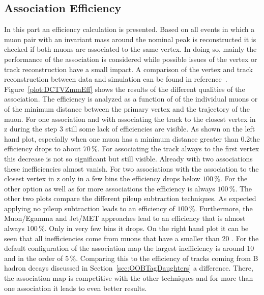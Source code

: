 \subsection{Association Efficiency \label{sec:DCTVAE}}

In this part an efficiency calculation is presented. Based on all events in which a muon pair with an invariant mass around the nominal \Zz peak is reconstructed it is checked if both muons are associated to the same vertex. In doing so, mainly the performance of the association is considered while possible issues of the vertex or track reconstruction have a small impact. A comparison of the vertex and track reconstruction between data and simulation can be found in reference~. Figure~\ref{plot:DCTVZmmEff} shows the results of the different qualities of the association. The efficiency is analyzed as a function of \pt{} of the individual muons or of the minimum distance between the primary vertex and the trajectory of the muon.  For one association and with associating the track to the closest vertex in z during the step 3 still some lack of efficiencies are visible. As shown on the left hand plot, especially when one muon has a minimum distance greater than 0.2\mm the efficiency drops to about $70\,\%$. For associating the track always to the first vertex this decrease is not so significant but still visible. Already with two associations these inefficiencies almost vanish. For two associations with the association to the closest vertex in z only in a few bins the efficiency drops below $100\,\%$. For the other option as well as for more associations the efficiency is always $100\,\%$. The other two plots compare the different pileup subtraction techniques. As expected applying no pileup subtraction leads to an efficiency of $100\,\%$. Furthermore, the Muon/Egamma and Jet/MET approaches lead to an efficiency that is almost always $100\,\%$. Only in very few bins it drops. On the right hand plot it can be seen that all inefficiencies come from muons that have a \pt{} smaller than 20\GeV{} . For the default configuration of the association map the largest inefficiency is around 10\GeV{} and in the order of $5\,\%$. Comparing this to the efficiency of tracks coming from B hadron decays discussed in Section~\ref{sec:OOBTagDaughters} a difference. There, the association map is competitive with the other techniques and for more than one association it leads to even better results. 

